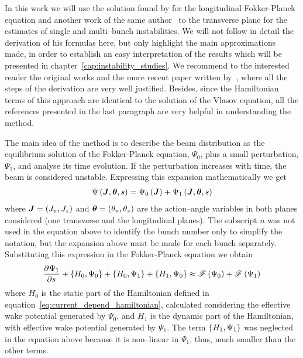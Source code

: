     In this work we will use the solution found by  for the longitudinal Fokker-Planck equation and another work of the same author~\cite{Suzuki1986} to the transverse plane for the estimates of single and multi--bunch instabilities. We will not follow in detail the derivation of his formulas here, but only highlight the main approximations made, in order to establish an easy interpretation of the results which will be presented in chapter~\ref{cap:instability_studies}. We recommend to the interested reader the original works and the more recent paper written by~, where all the steps of the derivation are very well justified. Besides, since the Hamiltonian terms of this approach are identical to the solution of the Vlasov equation, all the references presented in the last paragraph are very helpful in understanding the method.

    The main idea of the method is to describe the beam distribution as the equilibrium solution of the Fokker-Planck equation, $\Psi_0$, plus a small perturbation, $\Psi_1$, and analyse its time evolution. If the perturbation increases with time, the beam is considered unstable. Expressing this expansion mathematically we get
    \begin{align}
        \Psi\left(\boldsymbol{J},\boldsymbol{\theta}, s\right) = \Psi_0\left(\boldsymbol{J}\right) + \Psi_1\left(\boldsymbol{J},\boldsymbol{\theta}, s\right)
    \end{align}
    where $\boldsymbol{J}=(J_u,J_z)$ and $\boldsymbol{\theta}=(\theta_u,\theta_z)$ are the action--angle variables in both planes considered (one transverse and the longitudinal planes). The subscript $n$ was not used in the equation above to identify the bunch number only to simplify the notation, but the expansion above must be made for each bunch separately. Substituting this expression in the Fokker-Planck equation we obtain
    \begin{align}
        \frac{\partial^{{}}\Psi_1}{\partial s^{{}}} +  \left\{ H_0, \Psi_0 \right\} + \left\{ H_0, \Psi_1 \right\} +
        \left\{ H_1, \Psi_0 \right\} \approx \mathscr{F}\left(\Psi_0\right) + \mathscr{F}\left(\Psi_1\right)
    \end{align}
    where $H_0$ is the static part of the Hamiltonian defined in equation~\eqref{eq:current_depend_hamiltonian}, calculated considering the effective wake potential generated by $\Psi_0$, and $H_1$ is the dynamic part of the Hamiltonian, with effective wake potential generated by $\Psi_1$. The term $\left\{ H_1,\Psi_1 \right\}$ was neglected in the equation above because it is non--linear in $\Psi_1$, thus, much smaller than the other terms.

